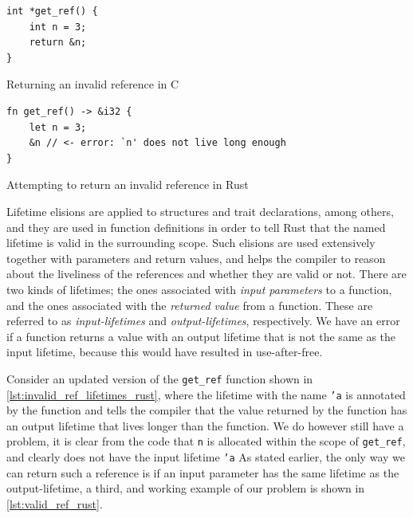 \begin{listing}[tb]
\begin{verbatim}
int *get_ref() {
    int n = 3;
    return &n;
}
\end{verbatim}
\caption{Returning an invalid reference in C}
\label{lst:invalid_ref_c}
\end{listing}

\begin{listing}[tb]
\begin{verbatim}
fn get_ref() -> &i32 {
    let n = 3;
    &n // <- error: `n' does not live long enough
}
\end{verbatim}
\caption{Attempting to return an invalid reference in Rust}
\label{lst:invalid_ref_rust}
\end{listing}

Lifetime elisions are applied to structures and trait declarations, among others, and they are used in function definitions in order to tell Rust that the named lifetime is valid in the surrounding scope.
Such elisions are used extensively together with parameters and return values, and helps the compiler to reason about the liveliness of the references and whether they are valid or not.
There are two kinds of lifetimes; the ones associated with \emph{input parameters} to a function, and the ones associated with the \emph{returned value} from a function.
These are referred to as \emph{input-lifetimes} and \emph{output-lifetimes}, respectively.
We have an error if a function returns a value with an output lifetime that is not the same as the input lifetime, because this would have resulted in use-after-free.

Consider an updated version of the \texttt{get\_ref} function shown in \autoref{lst:invalid_ref_lifetimes_rust}, where the lifetime with the name \texttt{'a} is annotated by the function and tells the compiler that the value returned by the function has an output lifetime that lives longer than the function.
We do however still have a problem, it is clear from the code that \texttt{n} is allocated within the scope of \texttt{get\_ref}, and clearly does not have the input lifetime \texttt{'a}
As stated earlier, the only way we can return such a reference is if an input parameter has the same lifetime as the output-lifetime, a third, and working example of our problem is shown in \autoref{lst:valid_ref_rust}.


